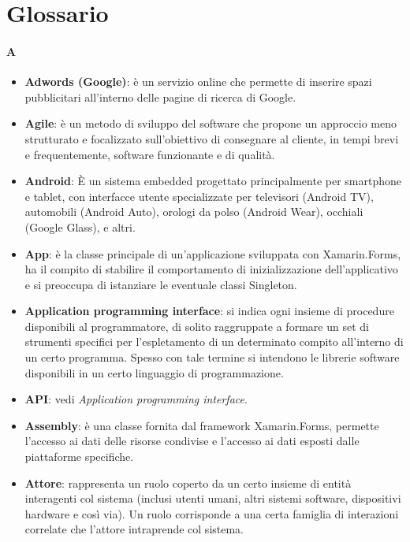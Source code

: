 \appendix
\newpage



\chapter{Glossario}

\subsubsection{A}
\begin{itemize}
	\item \textbf{Adwords (Google)}: è un servizio online che permette di inserire spazi pubblicitari all'interno delle pagine di ricerca di Google.
	\item \textbf{Agile}: è un metodo di sviluppo del software che propone un approccio meno strutturato e focalizzato sull'obiettivo di consegnare al cliente, in tempi brevi e frequentemente, software funzionante e di qualità.
	\item \textbf{Android}: È un sistema embedded progettato principalmente per smartphone e tablet, con interfacce utente specializzate per televisori (Android TV), automobili (Android Auto), orologi da polso (Android Wear), occhiali (Google Glass), e altri.
	\item \textbf{App}: è la classe principale di un'applicazione sviluppata con Xamarin.Forms, ha il compito di stabilire il comportamento di inizializzazione dell'applicativo e si preoccupa di istanziare le eventuale classi Singleton.
	\item \textbf{Application programming interface}: si indica ogni insieme di procedure disponibili al programmatore, di solito raggruppate a formare un set di strumenti specifici per l'espletamento di un determinato compito all'interno di un certo programma. Spesso con tale termine si intendono le librerie software disponibili in un certo linguaggio di programmazione.
	\item \textbf{API}: vedi \textit{Application programming interface}.
	\item \textbf{Assembly}: è una classe fornita dal framework Xamarin.Forms, permette l'accesso ai dati delle risorse condivise e l'accesso ai dati esposti dalle piattaforme specifiche.
	\item \textbf{Attore}: rappresenta un ruolo coperto da un certo insieme di entità interagenti col sistema (inclusi utenti umani, altri sistemi software, dispositivi hardware e così via). Un ruolo corrisponde a una certa famiglia di interazioni correlate che l'attore intraprende col sistema.
\end{itemize}


